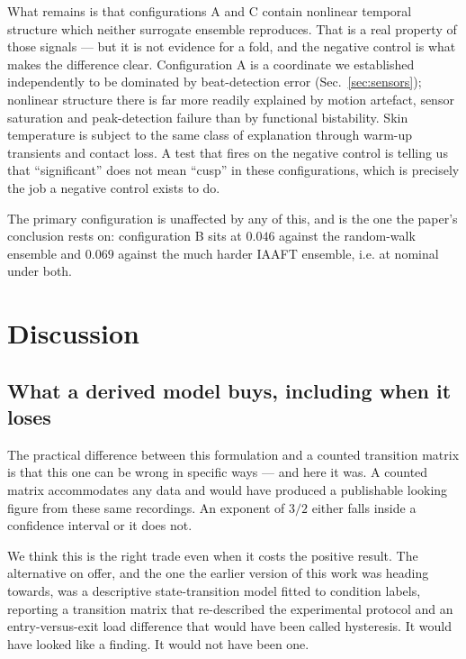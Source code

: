 \documentclass[conference]{IEEEtran}
\begin{document}
What remains is that configurations A and C contain nonlinear temporal
structure which neither surrogate ensemble reproduces. That is a real property
of those signals --- but it is not evidence for a fold, and the negative
control is what makes the difference clear. Configuration A is a coordinate we
established independently to be dominated by beat-detection error
(Sec.~\ref{sec:sensors}); nonlinear structure there is far more readily
explained by motion artefact, sensor saturation and peak-detection failure than
by functional bistability. Skin temperature is subject to the same class of
explanation through warm-up transients and contact loss. A test that fires on
the negative control is telling us that ``significant'' does not mean ``cusp''
in these configurations, which is precisely the job a negative control exists
to do.

The primary configuration is unaffected by any of this, and is the one the
paper's conclusion rests on: configuration B sits at $0.046$ against the
random-walk ensemble and $0.069$ against the much harder IAAFT ensemble, i.e.
at nominal under both.



\section{Discussion}

\subsection{What a derived model buys, including when it loses}
The practical difference between this formulation and a counted transition
matrix is that this one can be wrong in specific ways --- and here it was. A
counted matrix accommodates any data and would have produced a publishable
looking figure from these same recordings. An exponent of $3/2$ either falls
inside a confidence interval or it does not.

We think this is the right trade even when it costs the positive result. The
alternative on offer, and the one the earlier version of this work was heading
towards, was a descriptive state-transition model fitted to condition labels,
reporting a transition matrix that re-described the experimental protocol and
an entry-versus-exit load difference that would have been called hysteresis. It
would have looked like a finding. It would not have been one.
\end{document}

